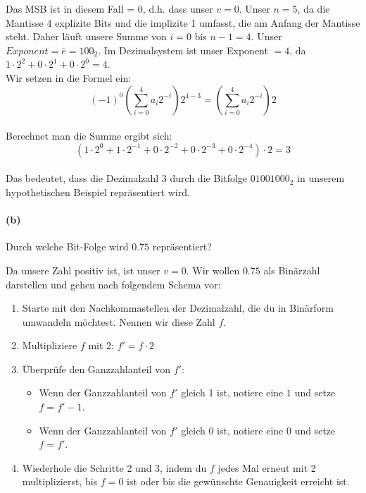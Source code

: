 \documentclass[12pt, letterpaper]{article}
\begin{document}
\noindent Das MSB ist in diesem Fall = $0$, d.h. dass unser $v = 0$. Unser $n = 5$, da die Mantisse 4 explizite Bits und die implizite 1 umfasst, die am Anfang der Mantisse steht. Daher läuft unsere Summe von $i = 0$ bis $n - 1 = 4$.
Unser $Exponent = \overline{e} = 100_2$. Im Dezimalsystem ist unser Exponent $= 4$, da $1 \cdot 2^{2} + 0 \cdot 2^{1} + 0 \cdot 2^{0} = 4$.\\Wir setzen in die Formel ein:\\

$$(-1)^0 \left( \sum_{i=0}^{4} a_i 2^{-i} \right) 2^{4 - 3} = \left( \sum_{i=0}^{4} a_i 2^{-i} \right) 2$$\\

\noindent Berechnet man die Summe ergibt sich:\\

$$(1 \cdot 2^{0} + 1 \cdot 2^{-1} + 0 \cdot 2^{-2} + 0 \cdot 2^{-3} + 0 \cdot 2^{-4})\cdot 2 = 3$$\\

\noindent Das bedeutet, dass die Dezimalzahl 3 durch die Bitfolge $01001000_2$ in unserem hypothetischen Beispiel repräsentiert wird.

\paragraph{(b)} Durch welche Bit-Folge wird $0.75$ repräsentiert?\newline

\noindent Da unsere Zahl positiv ist, ist unser $v = 0$. Wir wollen $0.75$ als Binärzahl darstellen und gehen nach folgendem Schema vor:

\begin{enumerate}
    \item Starte mit den Nachkommastellen der Dezimalzahl, die du in Binärform umwandeln möchtest. Nennen wir diese Zahl $f$.
    
    \item Multipliziere $f$ mit 2:
    $
    f' = f \cdot 2
    $
    
    \item Überprüfe den Ganzzahlanteil von $f'$:
    \begin{itemize}[label=$\circ$]
        \item Wenn der Ganzzahlanteil von $f'$ gleich 1 ist, notiere eine $1$ und setze $f = f' - 1 $.
        \item Wenn der Ganzzahlanteil von $f'$ gleich 0 ist, notiere eine $0$ und setze $f = f'$.
    \end{itemize}
    
    \item Wiederhole die Schritte 2 und 3, indem du $f$ jedes Mal erneut mit 2 multiplizierst, bis $f = 0$ ist oder bis die gewünschte Genauigkeit erreicht ist.
\end{enumerate}
\end{document}
